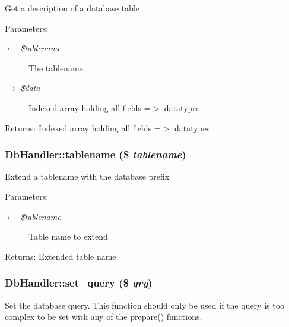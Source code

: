 Get a description of a database table

\begin{Desc}
\item[Parameters:]
\begin{description}
\item[\mbox{$\leftarrow$} {\em \$tablename}]The tablename \item[\mbox{$\rightarrow$} {\em \$data}]Indexed array holding all fields =$>$ datatypes \end{description}
\end{Desc}
\begin{Desc}
\item[Returns:]Indexed array holding all fields =$>$ datatypes \end{Desc}
\hypertarget{classDbHandler_baca15a312800e5522b3efd9dff036f5}{
\subsubsection{\setlength{\rightskip}{0pt plus 5cm}DbHandler::tablename (\$ {\em tablename})}}
\label{classDbHandler_baca15a312800e5522b3efd9dff036f5}


Extend a tablename with the database prefix

\begin{Desc}
\item[Parameters:]
\begin{description}
\item[\mbox{$\leftarrow$} {\em \$tablename}]Table name to extend \end{description}
\end{Desc}
\begin{Desc}
\item[Returns:]Extended table name \end{Desc}
\hypertarget{classDbHandler_305a3225c4760a88a06b0d55d0893962}{
\subsubsection{\setlength{\rightskip}{0pt plus 5cm}DbHandler::set\_\-query (\$ {\em qry})}}
\label{classDbHandler_305a3225c4760a88a06b0d55d0893962}


Set the database query. This function should only be used if the query is too complex to be set with any of the prepare() functions.


